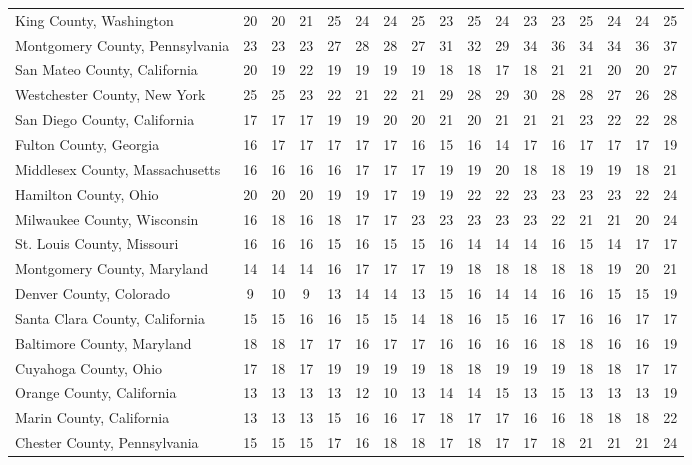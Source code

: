 \begin{landscape}
\begin{longtable}{lcccccccccccccccc}
		King County, Washington & 20 & 20 & 21 & 25 & 24 & 24 & 25 & 23 & 25 & 24 & 23 & 23 & 25 & 24 & 24 & 25 \\
		Montgomery County, Pennsylvania & 23 & 23 & 23 & 27 & 28 & 28 & 27 & 31 & 32 & 29 & 34 & 36 & 34 & 34 & 36 & 37 \\
		San Mateo County, California & 20 & 19 & 22 & 19 & 19 & 19 & 19 & 18 & 18 & 17 & 18 & 21 & 21 & 20 & 20 & 27 \\
		Westchester County, New York & 25 & 25 & 23 & 22 & 21 & 22 & 21 & 29 & 28 & 29 & 30 & 28 & 28 & 27 & 26 & 28 \\
		San Diego County, California & 17 & 17 & 17 & 19 & 19 & 20 & 20 & 21 & 20 & 21 & 21 & 21 & 23 & 22 & 22 & 28 \\
		Fulton County, Georgia & 16 & 17 & 17 & 17 & 17 & 17 & 16 & 15 & 16 & 14 & 17 & 16 & 17 & 17 & 17 & 19 \\
		Middlesex County, Massachusetts & 16 & 16 & 16 & 16 & 17 & 17 & 17 & 19 & 19 & 20 & 18 & 18 & 19 & 19 & 18 & 21 \\
		Hamilton County, Ohio & 20 & 20 & 20 & 19 & 19 & 17 & 19 & 19 & 22 & 22 & 23 & 23 & 23 & 23 & 22 & 24 \\
		Milwaukee County, Wisconsin & 16 & 18 & 16 & 18 & 17 & 17 & 23 & 23 & 23 & 23 & 23 & 22 & 21 & 21 & 20 & 24 \\
		St. Louis County, Missouri & 16 & 16 & 16 & 15 & 16 & 15 & 15 & 16 & 14 & 14 & 14 & 16 & 15 & 14 & 17 & 17 \\
		Montgomery County, Maryland & 14 & 14 & 14 & 16 & 17 & 17 & 17 & 19 & 18 & 18 & 18 & 18 & 18 & 19 & 20 & 21 \\
		Denver County, Colorado & 9 & 10 & 9 & 13 & 14 & 14 & 13 & 15 & 16 & 14 & 14 & 16 & 16 & 15 & 15 & 19 \\
		Santa Clara County, California & 15 & 15 & 16 & 16 & 15 & 15 & 14 & 18 & 16 & 15 & 16 & 17 & 16 & 16 & 17 & 17 \\
		Baltimore County, Maryland & 18 & 18 & 17 & 17 & 16 & 17 & 17 & 16 & 16 & 16 & 16 & 18 & 18 & 16 & 16 & 19 \\
		Cuyahoga County, Ohio & 17 & 18 & 17 & 19 & 19 & 19 & 19 & 18 & 18 & 19 & 19 & 19 & 18 & 18 & 17 & 17 \\
		Orange County, California & 13 & 13 & 13 & 13 & 12 & 10 & 13 & 14 & 14 & 15 & 13 & 15 & 13 & 13 & 13 & 19 \\
		Marin County, California & 13 & 13 & 13 & 15 & 16 & 16 & 17 & 18 & 17 & 17 & 16 & 16 & 18 & 18 & 18 & 22 \\
		Chester County, Pennsylvania & 15 & 15 & 15 & 17 & 16 & 18 & 18 & 17 & 18 & 17 & 17 & 18 & 21 & 21 & 21 & 24 \\

\end{longtable}
\end{landscape}
